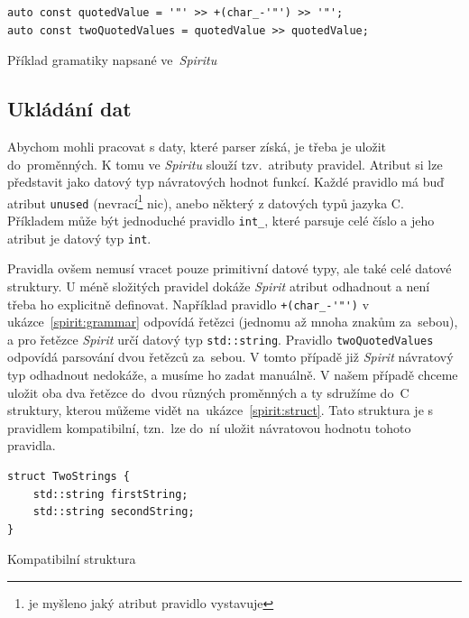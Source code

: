 \documentclass[thesis=B,czech,hidelinks]{FITthesis}[2019/03/06]
\newcommand{\Rplus}{\protect\hspace{-.1em}\protect\raisebox{.35ex}{\smaller{\smaller\textbf{+}}}}
\newcommand{\Cpp}{\mbox{C\Rplus\Rplus}\xspace}
\begin{document}
\begin{listing}[H]
\begin{verbatim}
auto const quotedValue = '"' >> +(char_-'"') >> '"';
auto const twoQuotedValues = quotedValue >> quotedValue;
\end{verbatim}
\caption{Příklad gramatiky napsané ve~\textit{Spiritu}}\label{spirit:grammar}
\end{listing}


\subsection{Ukládání dat}
Abychom mohli pracovat s daty, které parser získá, je třeba je uložit do~proměnných. K tomu ve \textit{Spiritu} slouží tzv.\ atributy pravidel. Atribut si lze představit jako datový typ návratových hodnot funkcí. Každé pravidlo má buď atribut \texttt{unused} (nevrací\footnote{ je myšleno jaký atribut pravidlo vystavuje} nic), anebo některý z datových typů jazyka \Cpp{}. Příkladem může být jednoduché pravidlo \verb¨int_¨, které parsuje celé číslo a jeho atribut je datový typ \texttt{int}.

Pravidla ovšem nemusí vracet pouze primitivní datové typy, ale také celé datové struktury. U méně složitých pravidel dokáže \textit{Spirit} atribut odhadnout a není třeba ho explicitně definovat. Například pravidlo \verb¨+(char_-'"')¨ v ukázce~\ref{spirit:grammar} odpovídá řetězci (jednomu až mnoha znakům za~sebou), a pro řetězce \textit{Spirit} určí datový typ \texttt{std::string}. Pravidlo \texttt{twoQuotedValues} odpovídá parsování dvou řetězců za~sebou. V tomto případě již \textit{Spirit} návratový typ odhadnout nedokáže, a musíme ho zadat manuálně. V našem případě chceme uložit oba dva řetězce do~dvou různých proměnných a ty sdružíme do~\Cpp{} struktury, kterou můžeme vidět na~ukázce~\ref{spirit:struct}. Tato struktura je s pravidlem kompatibilní, tzn.\ lze do~ní uložit návratovou hodnotu tohoto pravidla.

\begin{listing}
\begin{verbatim}
struct TwoStrings {
    std::string firstString;
    std::string secondString;
}
\end{verbatim}
\caption{Kompatibilní struktura}\label{spirit:struct}
\end{listing}
\end{document}
